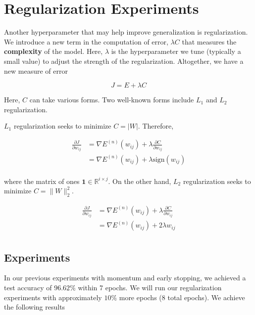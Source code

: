 \section{Regularization Experiments}

Another hyperparameter that may help improve generalization is
regularization. We introduce a new term in the computation of error, $\lambda C$
that measures the \textbf{complexity} of the model. Here, $\lambda$ is the
hyperparameter we tune (typically a small value) to adjust the
strength of the regularization. Altogether, we have a new measure of error

\begin{equation*}
	J = E + \lambda C
\end{equation*}

Here, $C$ can take various forms. Two well-known forms include $L_1$ and $L_2$
regularization.

$L_1$ regularization seeks to minimize $C = |W|$. Therefore,

\begin{equation*}
	\begin{aligned}
		\frac{\partial J}{\partial w_{ij}} & = \nabla E^{(n)}(w_{ij}) + \lambda
		\frac{\partial C}{\partial w_{ij}}                                      \\
		                                   & = \nabla E^{(n)}(w_{ij}) + \lambda
		\text{sign}  (w_{ij})                                                   \\
	\end{aligned}
\end{equation*}

where the matrix of ones $\mathbf{1} \in \mathbb{R}^{i \times j}$. On the other
hand, $L_2$ regularization seeks to minimize $C = \| W \|^2_2$.

\begin{equation*}
	\begin{aligned}
		\frac{\partial J}{\partial w_{ij}} & = \nabla E^{(n)}(w_{ij}) + \lambda
		\frac{\partial C}{\partial w_{ij}}                                        \\
		                                   & = \nabla E^{(n)}(w_{ij}) + 2 \lambda
		w_{ij}                                                                    \\
	\end{aligned}
\end{equation*}

\subsection{Experiments}
In our previous experiments with momentum and early stopping, we achieved a test
accuracy of $96.62\%$ within 7 epochs. We will run our regularization
experiments with approximately $10\%$ more epochs (8 total epochs). We achieve
the following results

